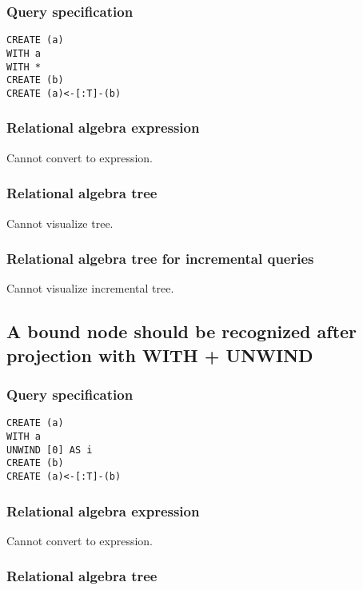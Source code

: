 \subsubsection*{Query specification}

\begin{lstlisting}
CREATE (a)
WITH a
WITH *
CREATE (b)
CREATE (a)<-[:T]-(b)
\end{lstlisting}

\subsubsection*{Relational algebra expression}

Cannot convert to expression.

\subsubsection*{Relational algebra tree}

Cannot visualize tree.

\subsubsection*{Relational algebra tree for incremental queries}

Cannot visualize incremental tree.

\subsection{A bound node should be recognized after projection with WITH + UNWIND}

\subsubsection*{Query specification}

\begin{lstlisting}
CREATE (a)
WITH a
UNWIND [0] AS i
CREATE (b)
CREATE (a)<-[:T]-(b)
\end{lstlisting}

\subsubsection*{Relational algebra expression}

Cannot convert to expression.

\subsubsection*{Relational algebra tree}


